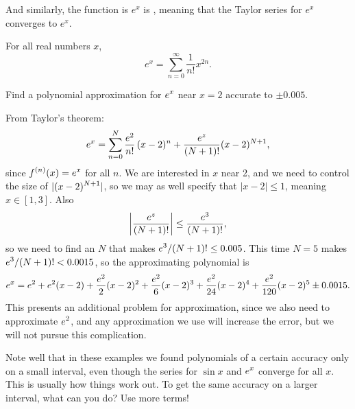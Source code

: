 And similarly, the function is $e^x$ is ,
meaning that the Taylor series for $e^x$ converges to $e^x$.
\begin{theorem}\label{thm:exp-is-analytic}
  For all real numbers $x$,
  $$
  e^x = \sum_{n=0}^\infty \frac{1}{n!} x^{2n}.
  $$  
\end{theorem}


\begin{example} Find a polynomial approximation for $\displaystyle e^x$ near $x=2$
accurate to $\pm
0.005$. 
\end{example}
\begin{solution}
From Taylor's theorem:
$$
  e^x= \sum_{n=0}^N{e^2\over n!}\,(x-2)^n + 
  {e^z\over (N+1)!}(x-2)^{N+1},
$$
since $\displaystyle f^{(n)}(x)=e^x$ for all $n$. We are interested in $x$ near
2, and we need to control the size of $\displaystyle |(x-2)^{N+1}|$, so we may
as well specify that $|x-2|\le 1$, meaning $x\in[1,3]$.  Also
$$\left|{e^z\over (N+1)!}\right|\le {e^3\over (N+1)!},$$
so we need to find an $N$ that makes $\displaystyle e^3/(N+1)!\le 0.005$. This time
$N=5$ makes $\displaystyle e^3/(N+1)!< 0.0015$, so the approximating polynomial is
$$
  e^x=e^2+e^2(x-2)+{e^2\over2}(x-2)^2+{e^2\over6}(x-2)^3+
  {e^2\over24}(x-2)^4+{e^2\over120}(x-2)^5
  \pm 0.0015.
$$
This presents an additional problem for approximation, since we also
need to approximate $\displaystyle e^2$, and any approximation we use will increase
the error, but we will not pursue this complication.
\end{solution}

Note well that in these examples we found polynomials of a certain
accuracy only on a small interval, even though the series for $\sin x$
and $\displaystyle e^x$ converge for all $x$.  This is usually how things work
out.  To get the same accuracy on a larger interval, what can you do?
Use more terms!

